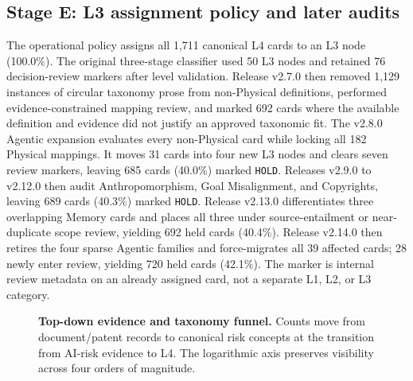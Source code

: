 \documentclass[11pt,a4paper]{article}
\newcommand{\code}[1]{\texttt{#1}}
\begin{document}
\subsection{Stage E: L3 assignment policy and later audits}

The operational policy assigns all 1,711 canonical L4 cards to an L3 node
(100.0\%). The original three-stage classifier used 50 L3 nodes and retained
76 decision-review markers after level validation. Release v2.7.0 then removed
1,129 instances of circular taxonomy prose from non-Physical definitions,
performed evidence-constrained mapping review, and marked 692 cards where the
available definition and evidence did not justify an approved taxonomic fit.
The v2.8.0 Agentic expansion evaluates every non-Physical card while locking
all 182 Physical mappings. It moves 31 cards into four new L3 nodes and clears
seven review markers, leaving 685 cards (40.0\%) marked \code{HOLD}. Releases
v2.9.0 to v2.12.0 then audit Anthropomorphism, Goal Misalignment, and Copyrights,
leaving 689 cards (40.3\%) marked \code{HOLD}. Release v2.13.0 differentiates
three overlapping Memory cards and places all three under source-entailment or
near-duplicate scope review, yielding 692 held cards (40.4\%). Release v2.14.0
then retires the four sparse Agentic families and force-migrates all 39 affected
cards; 28 newly enter review, yielding 720 held cards (42.1\%). The marker
is internal review metadata on an already assigned card, not a separate L1,
L2, or L3 category.

\begin{figure}[H]
\centering
{}
\caption{\textbf{Top-down evidence and taxonomy funnel.} Counts move from
document/patent records to canonical risk concepts at the transition from
AI-risk evidence to L4. The logarithmic axis preserves visibility across four
orders of magnitude.}
\label{fig:funnel}
\end{figure}
\end{document}
